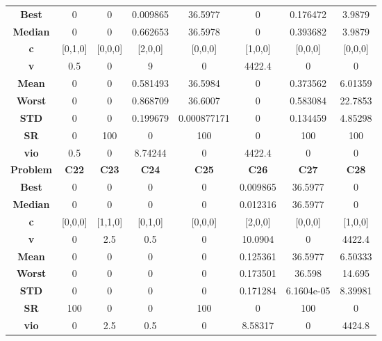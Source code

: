 \documentclass{IEEEtran}
\begin{document}
\begin{center}
\begin{tabular}{|c|c|c|c|c|c|c|c|}
    \hline\hline 
    \textbf{Best} & 0 & 0 & 0.009865 & 36.5977 & 0 & 0.176472 & 3.9879\\ 
    \textbf{Median} & 0 & 0 & 0.662653 & 36.5978 & 0 & 0.393682 & 3.9879\\ 
    \textbf{c} & [0,1,0] & [0,0,0] & [2,0,0] & [0,0,0] & [1,0,0] & [0,0,0] & [0,0,0]\\ 
    \textbf{v} & 0.5 & 0 & 9 & 0 & 4422.4 & 0 & 0\\ 
    \textbf{Mean} & 0 & 0 & 0.581493 & 36.5984 & 0 & 0.373562 & 6.01359\\ 
    \textbf{Worst} & 0 & 0 & 0.868709 & 36.6007 & 0 & 0.583084 & 22.7853\\ 
    \textbf{STD} & 0 & 0 & 0.199679 & 0.000877171 & 0 & 0.134459 & 4.85298\\ 
    \textbf{SR} & 0 & 100 & 0 & 100 & 0 & 100 & 100\\ 
    \textbf{vio} & 0.5 & 0 & 8.74244 & 0 & 4422.4 & 0 & 0\\ 
    \hline 
    \hline 
    \textbf{Problem} & \textbf{C22} & \textbf{C23} & \textbf{C24} & \textbf{C25} & \textbf{C26} & \textbf{C27} & \textbf{C28} \\ 
    \hline\hline 
    \textbf{Best} & 0 & 0 & 0 & 0 & 0.009865 & 36.5977 & 0\\ 
    \textbf{Median} & 0 & 0 & 0 & 0 & 0.012316 & 36.5977 & 0\\ 
    \textbf{c} & [0,0,0] & [1,1,0] & [0,1,0] & [0,0,0] & [2,0,0] & [0,0,0] & [1,0,0]\\ 
    \textbf{v} & 0 & 2.5 & 0.5 & 0 & 10.0904 & 0 & 4422.4\\ 
    \textbf{Mean} & 0 & 0 & 0 & 0 & 0.125361 & 36.5977 & 6.50333\\ 
    \textbf{Worst} & 0 & 0 & 0 & 0 & 0.173501 & 36.598 & 14.695\\ 
    \textbf{STD} & 0 & 0 & 0 & 0 & 0.171284 & 6.1604e-05 & 8.39981\\ 
    \textbf{SR} & 100 & 0 & 0 & 100 & 0 & 100 & 0\\ 
    \textbf{vio} & 0 & 2.5 & 0.5 & 0 & 8.58317 & 0 & 4424.8\\ 
    \hline 
  \end{tabular}
\end{center}
\newpage
\end{document}
